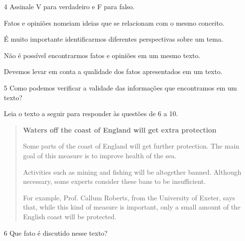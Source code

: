
\num{4} Assinale V para verdadeiro e F para falso.

\begin{boxlist}
\item Fatos e opiniões nomeiam ideias que se relacionam com o mesmo conceito. 

\item É muito importante identificarmos diferentes perspectivas sobre um
tema. 

\item Não é possível encontrarmos fatos e opiniões em um mesmo texto. 

\item Devemos levar em conta a qualidade dos fatos apresentados em um
texto. 
\end{boxlist}

\num{5} Como podemos verificar a validade das informações que encontramos em um texto?



Leia o texto a seguir para responder às questões de 6 a 10.


\begin{quote}
\textbf{Waters off the coast of England will get extra protection}

Some parts of the coast of England will get further protection. The main goal of this measure is to improve health of the sea.

Activities such as mining and fishing will be altogether banned. Although necessary, some experts consider these bans to be insufficient.

For example, Prof. Callum Roberts, from the University of Exeter, says that, while this kind of measure is important, only a small amount of the English coast will be protected. 

\end{quote}


\num{6} Que fato é discutido nesse texto?



